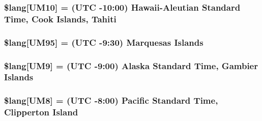 \subsubsection[{\$lang}]{\setlength{\rightskip}{0pt plus 5cm}\$lang\mbox{[}\textquotesingle{}U\+M10\textquotesingle{}\mbox{]} = \textquotesingle{}(U\+T\+C -\/10\+:00) Hawaii-\/Aleutian Standard Time, Cook Islands, Tahiti\textquotesingle{}}\label{system_2language_2english_2date__lang_8php_a671d507e120e16f7e7718be0ed0aea74}
\hypertarget{system_2language_2english_2date__lang_8php_a7cd7a4418ccf42c7daae2a098ba8f9e6}{}
\subsubsection[{\$lang}]{\setlength{\rightskip}{0pt plus 5cm}\$lang\mbox{[}\textquotesingle{}U\+M95\textquotesingle{}\mbox{]} = \textquotesingle{}(U\+T\+C -\/9\+:30) Marquesas Islands\textquotesingle{}}\label{system_2language_2english_2date__lang_8php_a7cd7a4418ccf42c7daae2a098ba8f9e6}
\hypertarget{system_2language_2english_2date__lang_8php_a5509302f8ddd971cb58e1f49f012bbac}{}
\subsubsection[{\$lang}]{\setlength{\rightskip}{0pt plus 5cm}\$lang\mbox{[}\textquotesingle{}U\+M9\textquotesingle{}\mbox{]} = \textquotesingle{}(U\+T\+C -\/9\+:00) Alaska Standard Time, Gambier Islands\textquotesingle{}}\label{system_2language_2english_2date__lang_8php_a5509302f8ddd971cb58e1f49f012bbac}
\hypertarget{system_2language_2english_2date__lang_8php_ab3ed4c273fcb61197ef7d8e4bae07415}{}
\subsubsection[{\$lang}]{\setlength{\rightskip}{0pt plus 5cm}\$lang\mbox{[}\textquotesingle{}U\+M8\textquotesingle{}\mbox{]} = \textquotesingle{}(U\+T\+C -\/8\+:00) Pacific Standard Time, Clipperton Island\textquotesingle{}}\label{system_2language_2english_2date__lang_8php_ab3ed4c273fcb61197ef7d8e4bae07415}
\hypertarget{system_2language_2english_2date__lang_8php_aa642f12cf461f915682b17c0c30b2475}{}
